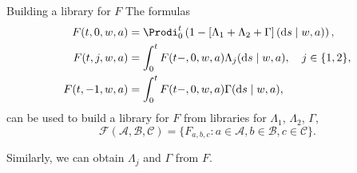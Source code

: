 \documentclass[smaller]{beamer}\usepackage{listings}
\newcommand*\diff{\mathop{}\!\mathrm{d}}
\newcommand{\midd}{\; \middle|\;}
\newcommand{\1}{\mathds{1}}
\begin{document}
\begin{frame}[label={sec:org530332d}]{Building a library for \(F\)}
The formulas
\begin{align*}
  F(t, 0, w,a)
  &
    = \Prodi_0^t
    \left( 1 - 
    \left[\Lambda_{1} + \Lambda_{2} + \Gamma
    \right](\diff s \mid w,a) \right),
  \\
  F(t, j, w,a)
  &
    = \int_0^t F(t-,0, w,a)  \Lambda_{j}(\diff s \mid w,a),
    \quad  j \in \{1,2\},
  \\
  F(t, -1, w,a)
  &
    = \int_0^tF(t-,0, w,a)  \Gamma(\diff s \mid w,a),
\end{align*}
can be used to build a library for \(F\) from libraries for \(\Lambda_1\), \(\Lambda_2\), \(\Gamma\),
\begin{equation*}
  \mathcal{F}(\mathcal{A}, \mathcal{B}, \mathcal{C})
  = \{ F_{a, b, c} : a \in \mathcal{A}, b \in \mathcal{B},
  c \in \mathcal{C}\}.
\end{equation*}

\vfill

Similarly, we can obtain \(\Lambda_j\) and \(\Gamma\) from \(F\).
\end{frame}
\end{document}
